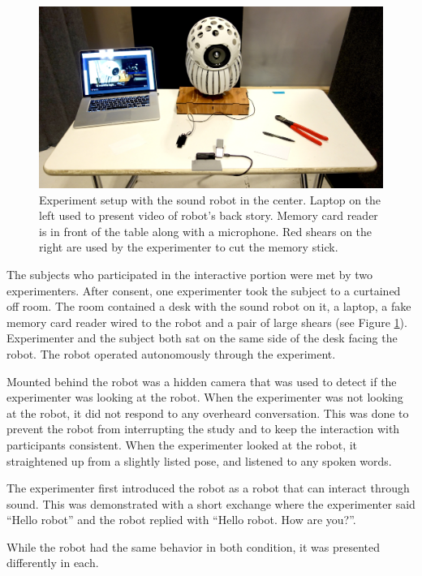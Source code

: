    \begin{figure}[thpb]
      \centering
      \includegraphics[width=4.6in]{figures/study/experiment_setup.jpg}
      \caption{Experiment setup with the sound robot in the center. Laptop on the left used to present video of robot's back story. Memory card reader is in front of the table along with a microphone. Red shears on the right are used by the experimenter to cut the memory stick.}
      \label{fig_study_experiment_setup}
   \end{figure}



The subjects who participated in the interactive portion were met by two experimenters. After consent, one experimenter took the subject to a curtained off room. The room contained a desk with the sound robot on it, a laptop, a fake memory card reader wired to the robot and a pair of large shears (see Figure \ref{fig_study_experiment_setup}). Experimenter and the subject both sat on the same side of the desk facing the robot. The robot operated autonomously through the experiment. 

Mounted behind the robot was a hidden camera that was used to detect if the experimenter was looking at the robot. When the experimenter was not looking at the robot, it did not respond to any overheard conversation. This was done to prevent the robot from interrupting the study and to keep the interaction with participants consistent.  When the experimenter looked at the robot, it straightened up from a slightly listed pose, and listened to any spoken words. 

The experimenter first introduced the robot as a robot that can interact through sound. This was demonstrated with a short exchange where the experimenter said ``Hello robot'' and the robot replied with ``Hello robot. How are you?''.   

While the robot had the same behavior in both condition, it was presented differently in each.

